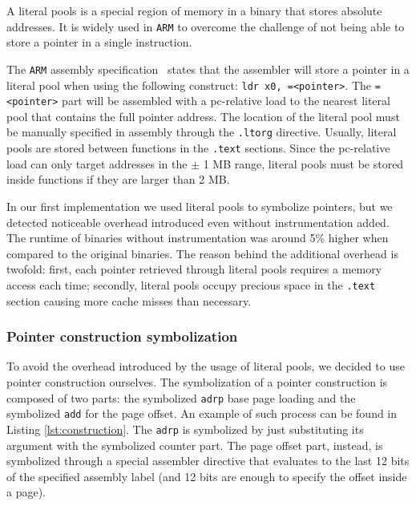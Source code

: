 \documentclass[a4paper,11pt,oneside]{report}
\begin{document}
A literal pools is a special region of memory in a binary that stores absolute
addresses. It is widely used in \texttt{ARM} to overcome the challenge of not
being able to store a pointer in a single instruction. 

The \texttt{ARM} assembly specification~\cite{literalpoolsarm} states that the
assembler will store a pointer in a literal pool when using the following
construct: \texttt{ldr x0, =<pointer>}.  The \texttt{=<pointer>} part will be
assembled with a pc-relative load to the nearest literal pool that contains the
full pointer address.  The location of the literal pool must be manually
specified in assembly through the \texttt{.ltorg} directive. Usually, literal
pools are stored between functions in the \texttt{.text} sections. Since the
pc-relative load can only target addresses in the $\pm$ 1 MB range, literal
pools must be stored inside functions if they are larger than 2 MB. 

In our first implementation we used literal pools to symbolize pointers, but we
detected noticeable overhead introduced even without instrumentation added. The
runtime of binaries without instrumentation was around 5\% higher when compared
to the original binaries.  The reason behind the additional overhead is
twofold: first, each pointer retrieved through literal pools requires a memory
access each time; secondly, literal pools occupy precious space in the
\texttt{.text} section causing more cache misses than necessary. 


\subsubsection{Pointer construction symbolization}

To avoid the overhead introduced by the usage of literal pools, we decided to
use pointer construction ourselves. The symbolization of a pointer construction
is composed of two parts: the symbolized \texttt{adrp} base page loading and
the symbolized \texttt{add} for the page offset. An example of such process can
be found in Listing \ref{lst:construction}. The \texttt{adrp} is symbolized by just
substituting its argument with the symbolized counter part.  The page offset part,
instead, is symbolized through a special assembler directive that evaluates to the
last 12 bits of the specified assembly label (and 12 bits are enough to specify
the offset inside a page). 
\end{document}
